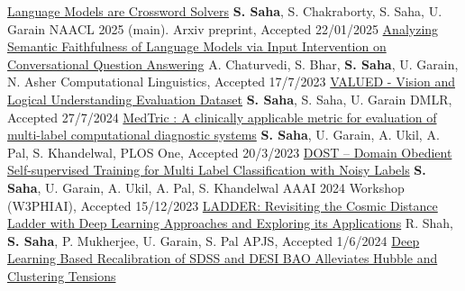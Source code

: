 \documentclass[10pt,a4paper]{article}
\begin{document}
\headedsection
  { \href{https://arxiv.org/abs/2406.09043}{Language Models are Crossword Solvers}}
  {\textbf{S. Saha}, S. Chakraborty, S. Saha, U. Garain} {%
  \headedsubsection
    {NAACL 2025 (main). Arxiv preprint, }
    {Accepted 22/01/2025}{}
}
\vspace{0.6em}
\headedsection
  { \href{https://direct.mit.edu/coli/article/50/1/119/118135/Analyzing-Semantic-Faithfulness-of-Language-Models}{Analyzing Semantic Faithfulness of Language Models via Input Intervention on Conversational Question Answering}}
  {A. Chaturvedi, S. Bhar, \textbf{S. Saha}, U. Garain, N. Asher} {%
  \headedsubsection
    {Computational Linguistics, }
    {Accepted 17/7/2023}{}
}
\vspace{0.6em}
\headedsection
  { \href{https://data.mlr.press/assets/pdf/v01-13.pdf}{VALUED - Vision and Logical Understanding Evaluation Dataset}}
  {\textbf{S. Saha}, S. Saha, U. Garain} {%
  \headedsubsection
    {DMLR, }
    {Accepted  27/7/2024}{}
}
\vspace{0.6em}
\headedsection
  { \href{https://doi.org/10.1371/journal.pone.0283895}{MedTric : A clinically applicable metric for evaluation of multi-label computational diagnostic systems}}
  {\textbf{S. Saha}, U. Garain, A. Ukil, A. Pal, S. Khandelwal,} {%
  \headedsubsection
    {PLOS One, }
    {Accepted 20/3/2023}{}
}
\vspace{0.6em}
\headedsection
  { \href{https://link.springer.com/chapter/10.1007/978-3-031-63592-2_10}{DOST -- Domain Obedient Self-supervised Training for Multi Label Classification with Noisy Labels}}
  {\textbf{S. Saha}, U. Garain, A. Ukil, A. Pal, S. Khandelwal} {%
  \headedsubsection
    {AAAI 2024 Workshop (W3PHIAI), }
    {Accepted 15/12/2023}{}
}
\vspace{0.6em}
\headedsection
  { \href{https://iopscience.iop.org/article/10.3847/1538-4365/ad5558}{LADDER: Revisiting the Cosmic Distance Ladder with Deep Learning Approaches and Exploring its Applications}}
  {R. Shah, \textbf{S. Saha}, P. Mukherjee, U. Garain, S. Pal} {%
  \headedsubsection
    {APJS, }
    {Accepted 1/6/2024}{}
}
\vspace{0.6em}
\headedsection
  { \href{https://arxiv.org/abs/2412.14750}{Deep Learning Based Recalibration of SDSS and DESI BAO Alleviates Hubble and Clustering Tensions}}
\end{document}
